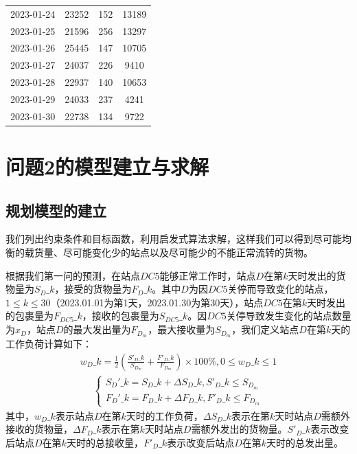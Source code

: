 \documentclass{MathorCupmodeling}
\begin{document}
\begin{table}[h]
\begin{tabular}{cccc}
2023-01-24             & 23252    & 152    & 13189    \\
2023-01-25             & 21596    & 256    & 13297    \\
2023-01-26             & 25445    & 147    & 10705    \\
2023-01-27             & 24037    & 226    & 9410    \\
2023-01-28             & 22937    & 140   & 10653    \\
2023-01-29             & 24033    & 237    & 4241    \\
2023-01-30             & 22738    & 134    & 9722    \\ \hline
\end{tabular}
\end{table}

\section{问题2的模型建立与求解}
\subsection{规划模型的建立}
我们列出约束条件和目标函数，利用启发式算法求解，这样我们可以得到尽可能均衡的载货量、尽可能变化少的站点以及尽可能少的不能正常流转的货物。

根据我们第一问的预测，在站点$DC5$能够正常工作时，站点$D$在第$k$天时发出的货物量为$S_D\_k$，接受的货物量为$F_D\_k$。其中$D$为因$DC5$关停而导致变化的站点，$1\le k\le 30$（2023.01.01为第1天，2023.01.30为第30天），站点$DC5$在第$k$天时发出的包裹量为$F_{DC5}\_k$，接收的包裹量为$S_{DC5}\_k$。因$DC5$关停导致发生变化的站点数量为$x_D$，站点$D$的最大发出量为$F_{D_m}$，最大接收量为$S_{D_m}$，我们定义站点$D$在第$k$天的工作负荷计算如下：
\begin{eqnarray}
w_D\_k=\frac{1}{2}(\frac{S'_D\_k}{S_{D_m}}+\frac{F'_D\_k}{F_{D_m}})\times100\%,0\le w_D\_k\le 1
\end{eqnarray}
\begin{eqnarray}
\left\{\begin{matrix}
 S_D'\_k=S_D\_k+\Delta S_D\_k,S'_D\_k\le S_{D_m} \\
  F_D'\_k=F_D\_k+\Delta F_D\_k,F'_D\_k\le F_{D_m}
\end{matrix}\right.
\end{eqnarray}
其中，$w_D\_k$表示站点$D$在第$k$天时的工作负荷，$\Delta S_D\_k$表示在第$k$天时站点$D$需额外接收的货物量，$\Delta F_D\_k$表示在第$k$天时站点$D$需额外发出的货物量。$S'_D\_k$表示改变后站点$D$在第$k$天时的总接收量，$F'_D\_k$表示改变后站点$D$在第$k$天时的总发出量。
\end{document}
